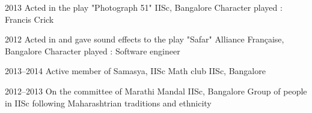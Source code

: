 \documentclass[11pt]{friggeri-cv}%
\begin{document}
\begin{entrylist}
  \entryy
    {2013}
    {Acted in the play "Photograph 51"}
    {IISc, Bangalore}
    {Character played : Francis Crick}
\end{entrylist}

\begin{entrylist}
  \entryy
    {2012}
    {Acted in and gave sound effects to the play "Safar"}
    {Alliance Française, Bangalore}
    {Character played : Software engineer}
\end{entrylist}




\begin{entrylist}
  \entryyy
    {2013--2014}
    {Active member of Samasya, IISc Math club}
    {IISc, Bangalore}

\end{entrylist}




\begin{entrylist}
  \entryy
    {2012--2013}
    {On the committee of Marathi Mandal}
    {IISc, Bangalore}
    {Group of people in IISc following Maharashtrian traditions and ethnicity}
\end{entrylist}

%
%
%
\end{document}
